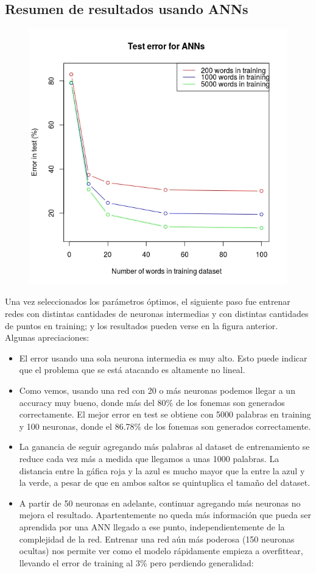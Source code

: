 \documentclass[paper=a4, fontsize=11pt]{scrartcl} %
\numberwithin{equation}{section} %
\numberwithin{figure}{section} %
\numberwithin{table}{section} %
\begin{document}
\subsection{Resumen de resultados usando ANNs}

\begin{figure}[h!]
\centering
\includegraphics[width=112mm]{annresults.jpg}
\end{figure}

Una vez seleccionados los parámetros óptimos, el siguiente paso fue entrenar redes con distintas cantidades de neuronas intermedias y con distintas cantidades de puntos en training; y los resultados pueden verse en la figura anterior. \\

Algunas apreciaciones:

\begin{itemize}
\item El error usando una sola neurona intermedia es muy alto. Esto puede indicar que el problema que se está atacando es altamente no lineal.
\item Como vemos, usando una red con 20 o más neuronas podemos llegar a un accuracy muy bueno, donde más del 80\% de los fonemas son generados correctamente. El mejor error en test se obtiene con 5000 palabras en training y 100 neuronas, donde el 86.78\% de los fonemas son generados correctamente.
\item La ganancia de seguir agregando más palabras al dataset de entrenamiento se reduce cada vez más a medida que llegamos a unas 1000 palabras. La distancia entre la gáfica roja y la azul es mucho mayor que la entre la azul y la verde, a pesar de que en ambos saltos se quintuplica el tamaño del dataset.
\item A partir de 50 neuronas en adelante, continuar agregando más neuronas no mejora el resultado. Apartentemente no queda más información que pueda ser aprendida por una ANN llegado a ese punto, independientemente de la complejidad de la red. Entrenar una red aún más poderosa (150 neuronas ocultas) nos permite ver como el modelo rápidamente empieza a overfittear, llevando el error de training al 3\% pero perdiendo generalidad:
\end{itemize}
\end{document}
